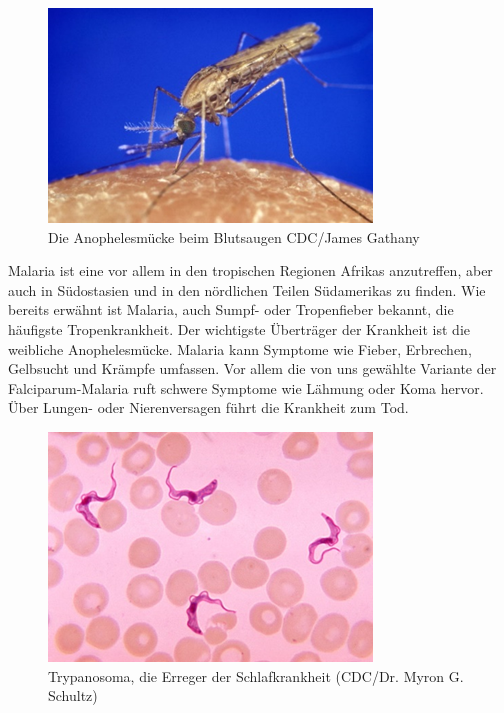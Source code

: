 \documentclass[11pt]{article}
\begin{document}
    \begin{figure}
        \includegraphics[width=\linewidth]{Anophelesmucke}
        \caption{Die Anophelesmücke beim Blutsaugen CDC/James Gathany}
    \end{figure}

    Malaria ist eine vor allem in den tropischen Regionen Afrikas anzutreffen, aber auch in Südostasien und in den nördlichen Teilen Südamerikas zu finden.
    Wie bereits erwähnt ist Malaria, auch Sumpf- oder Tropenfieber bekannt, die häufigste Tropenkrankheit.
    Der wichtigste Überträger der Krankheit ist die weibliche Anophelesmücke.
    Malaria kann Symptome wie Fieber, Erbrechen, Gelbsucht und Krämpfe umfassen.
    Vor allem die von uns gewählte Variante der Falciparum-Malaria ruft schwere Symptome wie Lähmung oder Koma hervor.
    Über Lungen- oder Nierenversagen führt die Krankheit zum Tod.

    \begin{figure}
        \includegraphics[width=\linewidth]{Trypanosoma}
        \caption{Trypanosoma, die Erreger der Schlafkrankheit (CDC/Dr. Myron G. Schultz)}
    \end{figure}
\end{document}
